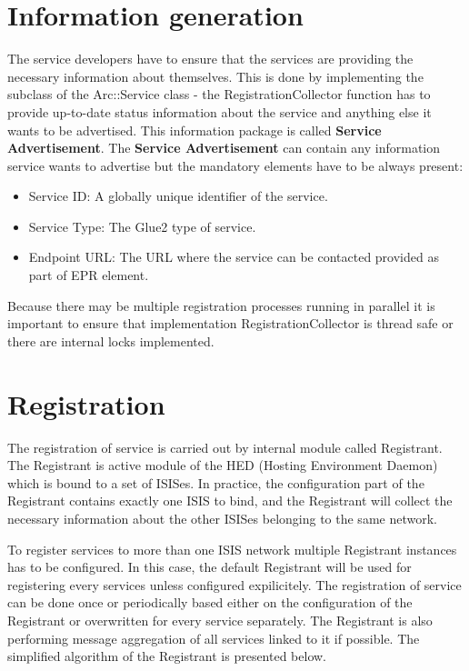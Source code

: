 \documentclass{book}
\begin{document}
\section{Information generation}
\label{sec:service_information_generation}

The service developers have to ensure that the services are providing the necessary information about themselves. This is done by implementing the subclass of the Arc::Service class - the RegistrationCollector function has to provide up-to-date status information about the service and anything else it wants to be advertised. This information package is called \textbf{Service Advertisement}.
\label{service_advertisement}
The \textbf{Service Advertisement} can contain any information service wants to advertise but the mandatory elements have to be always present:
\begin{itemize}
  \item Service ID: A globally unique identifier of the service.
  \item Service Type: The Glue2 type of service.
  \item Endpoint URL: The URL where the service can be contacted provided as part of EPR element.
\end{itemize}

Because there may be multiple registration processes running in parallel it is important to ensure that implementation RegistrationCollector is thread safe or there are internal locks implemented.



\section{Registration}
\label{sec:service_registration}

The registration of service is carried out by internal module called Registrant. The Registrant is active module of the HED (Hosting Environment Daemon) which is bound to a set of ISISes. In practice, the configuration part of the Registrant contains exactly one ISIS to bind, and the Registrant will collect the necessary information about the other ISISes belonging to the same network.

To register services to more than one ISIS network multiple Registrant instances has to be configured. In this case, the default Registrant will be used for registering every services unless configured expilicitely.
The registration of service can be done once or periodically based either on the configuration of the Registrant or overwritten for every service separately. The Registrant is also performing message aggregation of all services linked to it if possible. The simplified algorithm of the Registrant is presented below.
\end{document}
